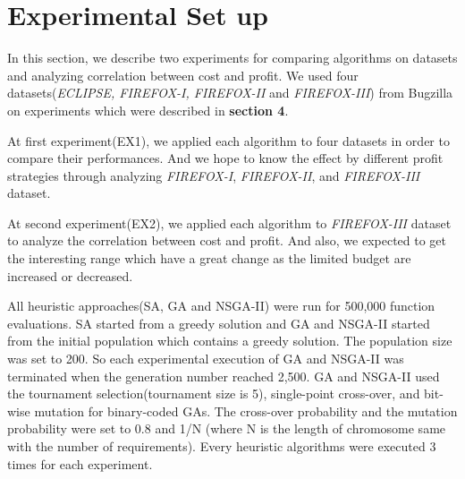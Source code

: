 





\section{Experimental Set up}
In this section, we describe two experiments for comparing algorithms on datasets and analyzing correlation between cost and profit. We used four datasets(\textit{ECLIPSE, FIREFOX-I, FIREFOX-II} and \textit{FIREFOX-III}) from Bugzilla on experiments which were described in \textbf{section 4}.

At first experiment(EX1), we applied each algorithm to four datasets in order to compare their performances. And we hope to know the effect by different profit strategies through analyzing \textit{FIREFOX-I}, \textit{FIREFOX-II}, and \textit{FIREFOX-III} dataset.

At second experiment(EX2), we applied each algorithm to \textit{FIREFOX-III} dataset to analyze the correlation between cost and profit. And also, we expected to get the interesting range which have a great change as the limited budget are increased or decreased.

All heuristic approaches(SA, GA and NSGA-II) were run for 500,000 function evaluations. SA started from a greedy solution and GA and NSGA-II started from the initial population which contains a greedy solution. The population size was set to 200. So each experimental execution of GA and NSGA-II was terminated when the generation number reached 2,500. GA and NSGA-II used the tournament selection(tournament size is 5), single-point cross-over, and bit-wise mutation for binary-coded GAs. The cross-over probability and the mutation probability were set to 0.8 and 1/N (where N is the length of chromosome same with the number of requirements). Every heuristic algorithms were executed 3 times for each experiment.


